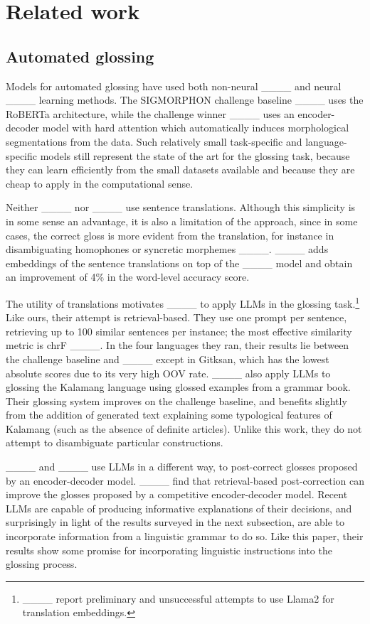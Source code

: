 \section{Related work}
\subsection{Automated glossing}


Models for automated glossing have used both non-neural ____ and neural ____ learning methods. The SIGMORPHON challenge baseline ____ uses the RoBERTa architecture, while the challenge winner ____ uses an encoder-decoder model with hard attention 
which automatically induces morphological segmentations from the data. Such relatively small task-specific and language-specific models still represent the state of the art for the glossing task, because they can learn efficiently from the small datasets available and because they are cheap to apply in the computational sense.

Neither ____ nor ____ use sentence translations. Although this simplicity is in some sense an advantage, it is also a limitation of the approach, since in some cases, the correct gloss is more evident from the translation, for instance in disambiguating homophones or syncretic morphemes ____. ____ adds embeddings of the sentence translations on top of the ____ model and obtain an improvement of 4\% in the word-level accuracy score.


The utility of translations motivates ____ to apply LLMs in the glossing task.\footnote{____ report preliminary and unsuccessful attempts to use Llama2 for translation embeddings.} Like ours, their attempt is retrieval-based. They use one prompt per sentence, retrieving up to 100 similar sentences per instance; the most effective similarity metric is chrF ____. In the four languages they ran, their results lie between the challenge baseline and ____ except in Gitksan, which has the lowest absolute scores due to its very high OOV rate. ____ also apply LLMs to glossing the Kalamang language using glossed examples from a grammar book. Their glossing system improves on the challenge baseline, and benefits slightly from the addition of generated text explaining some typological features of Kalamang (such as the absence of definite articles). Unlike this work, they do not attempt to disambiguate particular constructions.

____ and ____ use LLMs in a different way, to post-correct glosses proposed by an encoder-decoder model. ____ find that retrieval-based post-correction can improve the glosses proposed by a competitive encoder-decoder model. Recent LLMs are capable of producing informative explanations of their decisions, and surprisingly in light of the results surveyed in the next subsection, are able to incorporate information from a linguistic grammar to do so. Like this paper, their results show some promise for incorporating linguistic instructions into the glossing process.

